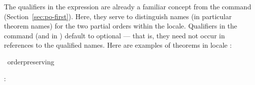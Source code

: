 \begin{isabellebody}
\begin{isamarkuptext}
  The qualifiers in the expression are already a familiar concept from
  the  command
  (Section~\ref{sec:po-first}).  Here, they serve to distinguish names
  (in particular theorem names) for the two partial orders within the
  locale.  Qualifiers in the  command (and in
  ) default to optional --- that is, they need
  not occur in references to the qualified names.  Here are examples
  of theorems in locale :%
\end{isamarkuptext}%
\isamarkuptrue%
%
\isadeliminvisible
%
\endisadeliminvisible
%
\isataginvisible
{}\isamarkupfalse%
\ order{\isacharunderscore}preserving\ %
\endisataginvisible
{\isafoldinvisible}%
%
\isadeliminvisible
%
\endisadeliminvisible
%
\begin{isamarkuptext}%
: 


\end{isamarkuptext}
\end{isabellebody}
